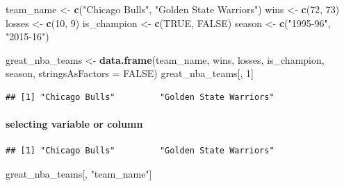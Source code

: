 \documentclass[
]{book}
\newenvironment{Shaded}{\begin{snugshade}}{\end{snugshade}}
\newcommand{\AttributeTok}[1]{\textcolor[rgb]{0.13,0.29,0.53}{#1}}
\newcommand{\ConstantTok}[1]{\textcolor[rgb]{0.56,0.35,0.01}{#1}}
\newcommand{\DecValTok}[1]{\textcolor[rgb]{0.00,0.00,0.81}{#1}}
\newcommand{\FunctionTok}[1]{\textcolor[rgb]{0.13,0.29,0.53}{\textbf{#1}}}
\newcommand{\NormalTok}[1]{#1}
\newcommand{\OtherTok}[1]{\textcolor[rgb]{0.56,0.35,0.01}{#1}}
\newcommand{\SpecialCharTok}[1]{\textcolor[rgb]{0.81,0.36,0.00}{\textbf{#1}}}
\newcommand{\StringTok}[1]{\textcolor[rgb]{0.31,0.60,0.02}{#1}}
\theoremstyle{definition}
\theoremstyle{definition}
\theoremstyle{definition}
\theoremstyle{definition}
\theoremstyle{remark}
\begin{document}
\begin{Shaded}
\begin{Highlighting}[]
\NormalTok{team\_name }\OtherTok{\textless{}{-}} \FunctionTok{c}\NormalTok{(}\StringTok{"Chicago Bulls"}\NormalTok{, }\StringTok{"Golden State Warriors"}\NormalTok{)}
\NormalTok{wins }\OtherTok{\textless{}{-}} \FunctionTok{c}\NormalTok{(}\DecValTok{72}\NormalTok{, }\DecValTok{73}\NormalTok{)}
\NormalTok{losses }\OtherTok{\textless{}{-}} \FunctionTok{c}\NormalTok{(}\DecValTok{10}\NormalTok{, }\DecValTok{9}\NormalTok{)}
\NormalTok{is\_champion }\OtherTok{\textless{}{-}} \FunctionTok{c}\NormalTok{(}\ConstantTok{TRUE}\NormalTok{, }\ConstantTok{FALSE}\NormalTok{)}
\NormalTok{season }\OtherTok{\textless{}{-}} \FunctionTok{c}\NormalTok{(}\StringTok{"1995{-}96"}\NormalTok{, }\StringTok{"2015{-}16"}\NormalTok{)}
 
\NormalTok{great\_nba\_teams }\OtherTok{\textless{}{-}} \FunctionTok{data.frame}\NormalTok{(team\_name, wins, losses, is\_champion, season, }\AttributeTok{stringsAsFactors =} \ConstantTok{FALSE}\NormalTok{)}
\NormalTok{great\_nba\_teams[, }\DecValTok{1}\NormalTok{]}
\end{Highlighting}
\end{Shaded}

\begin{verbatim}
## [1] "Chicago Bulls"         "Golden State Warriors"
\end{verbatim}

\paragraph{selecting variable or column}\label{selecting-variable-or-column}

\begin{Shaded}
\end{Shaded}

\begin{verbatim}
## [1] "Chicago Bulls"         "Golden State Warriors"
\end{verbatim}

\begin{Shaded}
\begin{Highlighting}[]
\NormalTok{great\_nba\_teams[, }\StringTok{"team\_name"}\NormalTok{]}
\end{Highlighting}
\end{Shaded}
\end{document}
